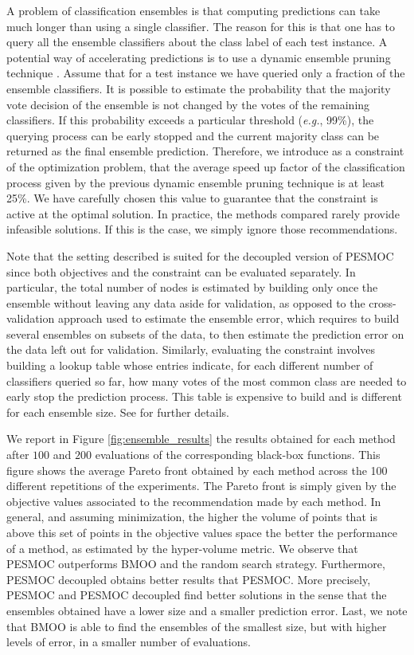 \documentclass[review,preprint,12pt]{elsarticle}
\begin{document}
A problem of classification ensembles is that computing predictions can take much longer than using a single 
classifier. The reason for this is that one has to query all the ensemble classifiers about the class 
label of each test instance. A potential way of accelerating predictions is to use a dynamic ensemble pruning 
technique \citep{hernandez2009statistical}. Assume that for a test instance we have queried only 
a fraction of the ensemble classifiers. It is possible to estimate the probability  that 
the majority vote decision of the ensemble is not changed by the votes of the remaining classifiers. If 
this probability exceeds a particular threshold (\emph{e.g.}, 99\%), the querying process can be early stopped 
and the current majority class can be returned as the final ensemble prediction. Therefore, we introduce as 
a constraint of the optimization problem, that the average speed up factor of the classification process 
given by the previous dynamic ensemble pruning technique is at least 25\%. 
We have carefully chosen this value to guarantee that the constraint is active at the optimal solution. 
In practice, the methods compared rarely provide infeasible solutions. If this is the case, we simply ignore those recommendations.

Note that the setting described is suited for the decoupled version of PESMOC since both objectives 
and the constraint can be evaluated separately. In particular, the total number of nodes is estimated 
by building only once the ensemble without leaving any data aside for validation, as opposed to the
cross-validation approach used to estimate the ensemble error, which requires to build several
ensembles on subsets of the data, to then estimate the prediction error on the data left out for
validation. Similarly, evaluating the constraint involves building a lookup table whose entries indicate, for 
each different number of classifiers queried so far, how many votes of the most common class are needed to 
early stop the prediction process. This table is expensive to build and is different for each ensemble size.
See \citep{hernandez2009statistical} for further details.

We report in Figure \ref{fig:ensemble_results} the results obtained for each method 
after $100$ and $200$ evaluations of the corresponding black-box functions. This figure shows the 
average Pareto front obtained by each method across the 100 different repetitions of the experiments.
The Pareto front is simply given by the objective values associated to the recommendation made by each
method. In general, and assuming minimization, the higher the volume of points that is above this set
of points in the objective values space the better the performance of a method, as estimated by the 
hyper-volume metric. We observe that PESMOC outperforms BMOO and the random search strategy. Furthermore, 
PESMOC decoupled obtains better results that PESMOC. More precisely, PESMOC and PESMOC decoupled find 
better solutions in the sense that the ensembles obtained have a lower size and a smaller prediction error.
Last, we note that BMOO is able to find the ensembles of the smallest size, but with higher levels of 
error, in a smaller number of evaluations.
\end{document}
